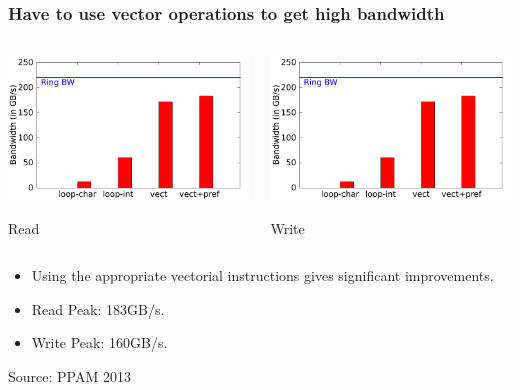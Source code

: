 \documentclass{beamer}
\begin{document}
\begin{frame}
  \frametitle{Have to use vector operations to get high bandwidth}
  
  \begin{columns}

    \begin{center}
      \includegraphics[width=\linewidth,page=1]{slides-figures/PPAM-data/bandwidth.pdf}
      
      Read
    \end{center}


    \begin{center}
      \includegraphics[width=\linewidth,page=2]{slides-figures/PPAM-data/bandwidth.pdf}
      
      Write
    \end{center}

  \end{columns}
  

  \begin{itemize}
  \item Using the appropriate vectorial instructions gives significant
    improvements.
  \item Read Peak: 183GB/s.
  \item Write Peak: 160GB/s.
  \end{itemize}

  \tiny Source: PPAM 2013
\end{frame}
\end{document}
